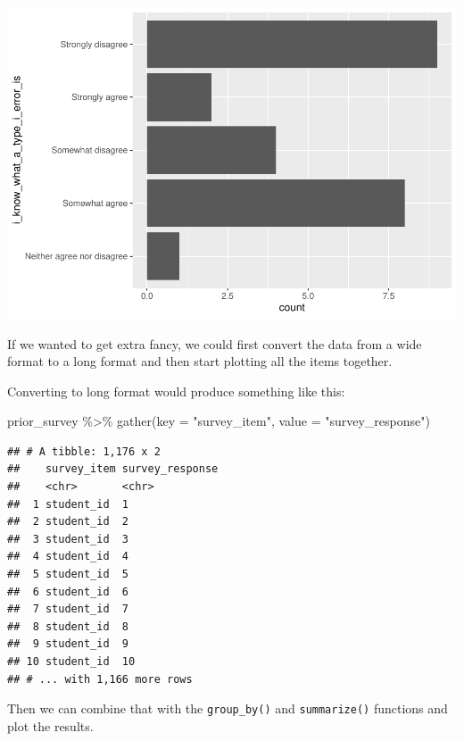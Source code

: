 \documentclass[
]{book}
\newenvironment{Shaded}{\begin{snugshade}}{\end{snugshade}}
\newcommand{\AttributeTok}[1]{\textcolor[rgb]{0.77,0.63,0.00}{#1}}
\newcommand{\FunctionTok}[1]{\textcolor[rgb]{0.00,0.00,0.00}{#1}}
\newcommand{\NormalTok}[1]{#1}
\newcommand{\SpecialCharTok}[1]{\textcolor[rgb]{0.00,0.00,0.00}{#1}}
\newcommand{\StringTok}[1]{\textcolor[rgb]{0.31,0.60,0.02}{#1}}
\begin{document}
\includegraphics{test_course_notes_files/figure-latex/unnamed-chunk-13-1.pdf}

If we wanted to get extra fancy, we could first convert the data from a wide format to a long format and then start plotting all the items together.

Converting to long format would produce something like this:

\begin{Shaded}
\begin{Highlighting}[]
\NormalTok{prior\_survey }\SpecialCharTok{\%\textgreater{}\%} 
  \FunctionTok{gather}\NormalTok{(}\AttributeTok{key =} \StringTok{"survey\_item"}\NormalTok{, }\AttributeTok{value =} \StringTok{"survey\_response"}\NormalTok{)}
\end{Highlighting}
\end{Shaded}

\begin{verbatim}
## # A tibble: 1,176 x 2
##    survey_item survey_response
##    <chr>       <chr>          
##  1 student_id  1              
##  2 student_id  2              
##  3 student_id  3              
##  4 student_id  4              
##  5 student_id  5              
##  6 student_id  6              
##  7 student_id  7              
##  8 student_id  8              
##  9 student_id  9              
## 10 student_id  10             
## # ... with 1,166 more rows
\end{verbatim}

Then we can combine that with the \texttt{group\_by()} and \texttt{summarize()} functions and plot the results.
\end{document}
